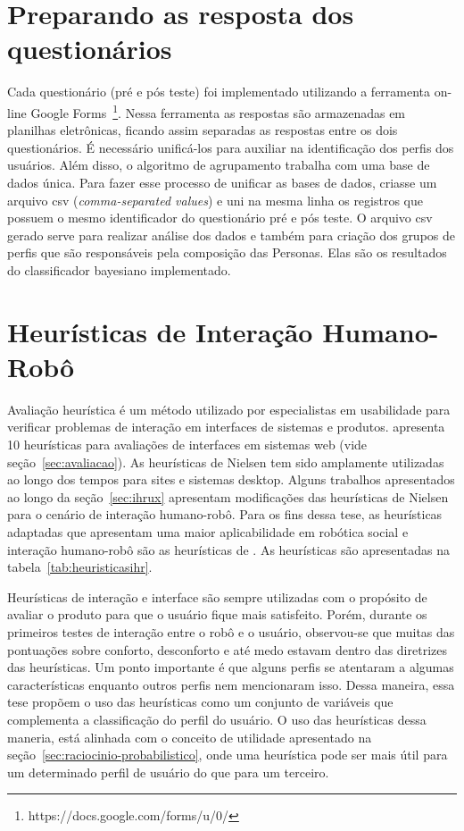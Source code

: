 \section{Preparando as resposta dos questionários}
\label{sec:respostasbd}
Cada questionário (pré e pós teste) foi implementado utilizando a ferramenta on-line Google Forms~\footnote{https://docs.google.com/forms/u/0/}. Nessa ferramenta as respostas são armazenadas em planilhas eletrônicas, ficando assim separadas as respostas entre os dois questionários. É necessário unificá-los para auxiliar na identificação dos perfis dos usuários. Além disso, o algoritmo de agrupamento trabalha com uma base de dados única. Para fazer esse processo de unificar as bases de dados, criasse um arquivo csv (\emph{comma-separated values}) e uni na mesma linha os registros que possuem o mesmo identificador do questionário pré e pós teste. O arquivo csv gerado serve para realizar análise dos dados e também para criação dos grupos de perfis que são responsáveis pela composição das Personas. Elas são os resultados do classificador bayesiano implementado.

\section{Heurísticas de Interação Humano-Robô}
\label{sec:heuristicas}
Avaliação heurística é um método utilizado por especialistas em usabilidade para verificar problemas de interação em interfaces de sistemas e produtos.  apresenta 10 heurísticas para avaliações de interfaces em sistemas web (vide seção~\ref{sec:avaliacao}). As heurísticas de Nielsen tem sido amplamente utilizadas ao longo dos tempos para sites e sistemas desktop. Alguns trabalhos apresentados ao longo da seção~\ref{sec:ihrux} apresentam modificações das heurísticas de Nielsen para o cenário de interação humano-robô. Para os fins dessa tese, as heurísticas adaptadas que apresentam uma maior aplicabilidade em robótica social e interação humano-robô são as heurísticas de . As heurísticas são apresentadas na tabela~\ref{tab:heuristicasihr}.

Heurísticas de interação e interface são sempre utilizadas com o propósito de avaliar o produto para que o usuário fique mais satisfeito. Porém, durante os primeiros testes de interação entre o robô e o usuário, observou-se que muitas das pontuações sobre conforto, desconforto e até medo estavam dentro das diretrizes das heurísticas. Um ponto importante é que alguns perfis se atentaram a algumas características enquanto outros perfis nem mencionaram isso. Dessa maneira, essa tese propõem o uso das heurísticas como um conjunto de variáveis que complementa a classificação do perfil do usuário. O uso das heurísticas dessa maneria, está alinhada com o conceito de utilidade apresentado na seção~\ref{sec:raciocinio-probabilistico}, onde uma heurística pode ser mais útil para um determinado perfil de usuário do que para um terceiro.


